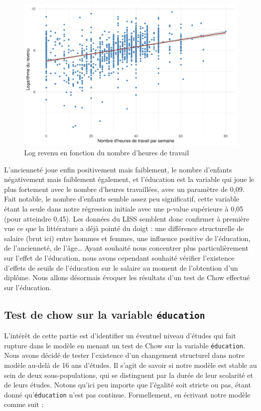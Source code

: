\documentclass[a4paper, french, 11 pt]{article}\usepackage[]{graphicx}\usepackage[]{xcolor}
\begin{document}
\begin{figure}[h]
\center
\includegraphics[width=0.7\linewidth]{figure/heures_logrevenu.pdf}
\caption{Log revenu en fonction du nombre d'heures de travail\label{fig:heureslogrevenu}}
\end{figure}

L’ancienneté joue enfin positivement mais faiblement, le nombre d’enfants négativement mais faiblement également, et l’éducation est la variable qui joue le plus fortement avec le nombre d’heures travaillées, avec un paramètre de 0,09. Fait notable, le nombre d’enfants semble assez peu significatif, cette variable étant la seule dans notre régression initiale avec une p-value supérieure à 0,05 (pour atteindre 0,45).
        Les données du LISS semblent donc confirmer à première vue ce que la littérature a déjà pointé du doigt : une différence structurelle de salaire (brut ici) entre hommes et femmes, une influence positive de l’éducation, de l’ancienneté, de l’âge… Ayant souhaité nous concentrer plus particulièrement sur l’effet de l’éducation, nous avons cependant souhaité vérifier l’existence d'effets de seuils de l’éducation sur le salaire au moment de l’obtention d’un diplôme. Nous allons désormais évoquer les résultats d’un test de Chow effectué sur l’éducation. 

\subsection{Test de chow sur la variable \texttt{éducation}}



L’intérêt de cette partie est d’identifier un éventuel niveau d’études qui fait rupture dans le modèle en menant un test de Chow sur la variable \texttt{éducation}. Nous avons décidé de tester l’existence d’un changement structurel dans notre modèle au-delà de 16 ans d’études. Il s’agit de savoir si notre modèle est stable au sein de deux sous-populations, qui se distinguent par la durée de leur scolarité et de leurs études. Notons qu’ici peu importe que l’égalité soit stricte ou pas, étant donné qu’\texttt{éducation} n’est pas continue. Formellement, en écrivant notre modèle comme suit :
\end{document}
